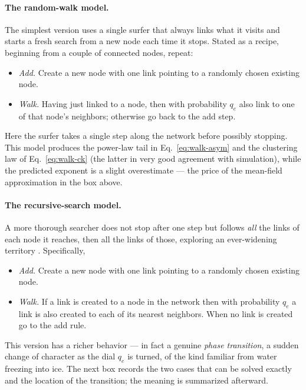 \paragraph{The random-walk model.} The simplest version uses a single surfer
that always links what it visits and starts a fresh search from a new node each
time it stops. Stated as a recipe, beginning from a couple of connected nodes,
repeat:
\begin{itemize}
  \item \emph{Add.} Create a new node with one link pointing to a randomly
    chosen existing node.
  \item \emph{Walk.} Having just linked to a node, then with probability $q_e$
    also link to one of that node's neighbors; otherwise go back to the add
    step.
\end{itemize}
%
Here the surfer takes a single step along the network before possibly 
stopping. This model produces the power-law tail in Eq.~\eqref{eq:walk-asym} 
and the clustering law of Eq.~\eqref{eq:walk-ck} (the latter in very good 
agreement with simulation), while the predicted exponent is a slight 
overestimate --- the price of the mean-field approximation in the box above.

\paragraph{The recursive-search model.} A more thorough searcher does not 
stop after one step but follows \emph{all} the links of each node it reaches, 
then all the links of those, exploring an ever-widening territory 
\citep{vazquez2001}. Specifically,
%
\begin{itemize}
  \item \emph{Add.} Create a new node with one link pointing to a randomly
    chosen existing node.
  \item \emph{Walk.} If a link is created to a node in the network then
    with probability $q_e$ a link is also created to each of its nearest
    neighbors. When no link is created go to the add rule.
\end{itemize}
%
This version has a richer behavior --- in fact a genuine \emph{phase transition},
a sudden change of character as the dial $q_e$ is turned, of the kind familiar
from water freezing into ice. The next box records the two cases that can be
solved exactly and the location of the transition; the meaning is summarized
afterward.

